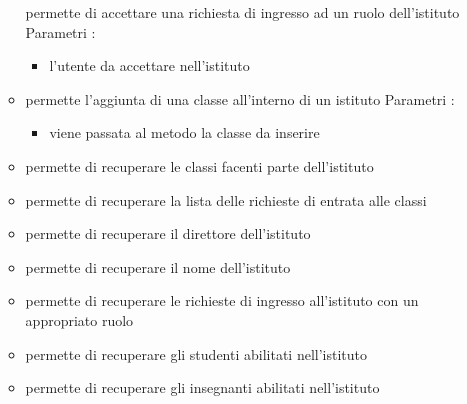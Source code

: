 \begin{itemize}
\begin{itemize}
permette di accettare una richiesta di ingresso ad un ruolo dell'istituto
\newline
Parametri :
\begin{itemize}
\item {}
\newline
l'utente da accettare nell'istituto
\end{itemize}
\item {}
\newline
permette l'aggiunta di una classe all'interno di un istituto
\newline
Parametri :
\begin{itemize}
\item {}
\newline
viene passata al metodo la classe da inserire
\end{itemize}
\item {}
\newline
permette di recuperare le classi facenti parte dell'istituto
\newline
\item {}
\newline
permette di recuperare la lista delle richieste di entrata alle classi
\newline
\item {}
\newline
permette di recuperare il direttore dell'istituto
\newline
\item {}
\newline
permette di recuperare il nome dell'istituto
\newline
\item {}
\newline
permette di recuperare le richieste di ingresso all'istituto con un appropriato ruolo
\newline
\item {}
\newline
permette di recuperare gli studenti abilitati nell'istituto
\newline
\item {}
\newline
permette di recuperare gli insegnanti abilitati nell'istituto
\newline

\end{itemize}
\end{itemize}
